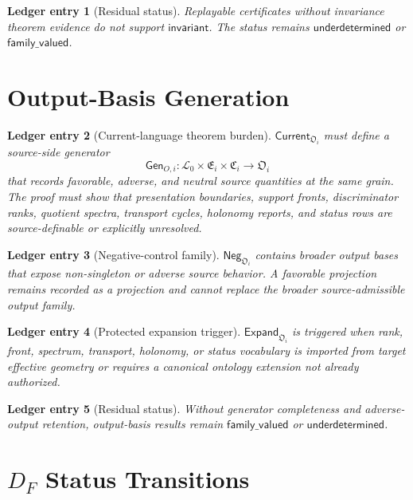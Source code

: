 \documentclass[11pt]{article}
\newcommand{\Lang}{\mathcal{L}_{0}}
\newcommand{\EnumFam}{\mathfrak{E}}
\newcommand{\CertFam}{\mathfrak{C}}
\newcommand{\OutFam}{\mathfrak{O}}
\newcommand{\Neg}{\mathsf{Neg}}
\newcommand{\Current}{\mathsf{Current}}
\newcommand{\Expand}{\mathsf{Expand}}
\newtheorem{ledgerentry}{Ledger entry}
\begin{document}
\begin{ledgerentry}[Residual status]
Replayable certificates without invariance theorem evidence do not support
\(\mathsf{invariant}\). The status remains \(\mathsf{underdetermined}\) or
\(\mathsf{family\_valued}\).
\end{ledgerentry}

\section{Output-Basis Generation}

\begin{ledgerentry}[Current-language theorem burden]
\(\Current_{\OutFam_i}\) must define a source-side generator
\[
\mathsf{Gen}_{O,i}:\Lang\times\EnumFam_i\times\CertFam_i\to\OutFam_i
\]
that records favorable, adverse, and neutral source quantities at the same
grain. The proof must show that presentation boundaries, support fronts,
discriminator ranks, quotient spectra, transport cycles, holonomy reports,
and status rows are source-definable or explicitly unresolved.
\end{ledgerentry}

\begin{ledgerentry}[Negative-control family]
\(\Neg_{\OutFam_i}\) contains broader output bases that expose non-singleton
or adverse source behavior. A favorable projection remains recorded as a
projection and cannot replace the broader source-admissible output family.
\end{ledgerentry}

\begin{ledgerentry}[Protected expansion trigger]
\(\Expand_{\OutFam_i}\) is triggered when rank, front, spectrum, transport,
holonomy, or status vocabulary is imported from target effective geometry or
requires a canonical ontology extension not already authorized.
\end{ledgerentry}

\begin{ledgerentry}[Residual status]
Without generator completeness and adverse-output retention, output-basis
results remain \(\mathsf{family\_valued}\) or \(\mathsf{underdetermined}\).
\end{ledgerentry}

\section{\texorpdfstring{\(D_F\)}{DF} Status Transitions}
\end{document}
